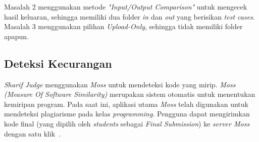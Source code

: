 Masalah 2 menggunakan metode \textit{"Input/Output Comparison"} untuk mengecek hasil keluaran, sehingga memiliki dua folder \textit{in} dan \textit{out} yang berisikan \textit{test cases}. Masalah 3 menggunakan pilihan \textit{Upload-Only}, sehingga tidak memiliki folder apapun.

\subsection{Deteksi Kecurangan}
\textit{Sharif Judge} menggunakan \textit{Moss} untuk mendeteksi kode yang mirip. \textit{Moss (Measure Of Software Similarity)} merupakan sistem otomatis untuk menentukan kemiripan program. Pada saat ini, aplikasi utama \textit{Moss} telah digunakan untuk mendeteksi plagiarisme pada kelas \textit{programming}. Pengguna dapat mengirimkan kode final (yang dipilih oleh \textit{students} sebagai \textit{Final Submission}) ke \textit{server Moss} dengan satu klik~\cite{mjnaderi:14:sharifjudgedoc}.\\

